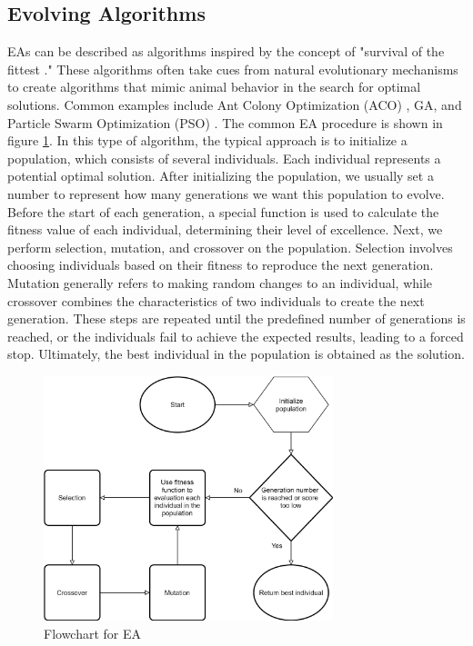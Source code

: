 \begin{ZhChapter}
    \subsection{Evolving Algorithms}
    EAs can be described as algorithms inspired by the concept of "survival of the fittest \cite{paul1988selection}." These algorithms often take cues from natural evolutionary mechanisms to create algorithms that mimic animal behavior in the search for optimal solutions. Common examples include Ant Colony Optimization (ACO) \cite{dorigo2006ant}, GA, and Particle Swarm Optimization (PSO) \cite{kennedy1995particle}. The common EA procedure is shown in figure \ref{fig: EA}. In this type of algorithm, the typical approach is to initialize a population, which consists of several individuals. Each individual represents a potential optimal solution. After initializing the population, we usually set a number to represent how many generations we want this population to evolve. Before the start of each generation, a special function is used to calculate the fitness value of each individual, determining their level of excellence. Next, we perform selection, mutation, and crossover on the population. Selection involves choosing individuals based on their fitness to reproduce the next generation. Mutation generally refers to making random changes to an individual, while crossover combines the characteristics of two individuals to create the next generation. These steps are repeated until the predefined number of generations is reached, or the individuals fail to achieve the expected results, leading to a forced stop. Ultimately, the best individual in the population is obtained as the solution.
    \begin{figure}[htbp]
        \centering
        \includegraphics[width = 0.75\textwidth]{image/EA.png}
        \caption{Flowchart for EA}
        \label{fig: EA}
    \end{figure}

\end{ZhChapter}
